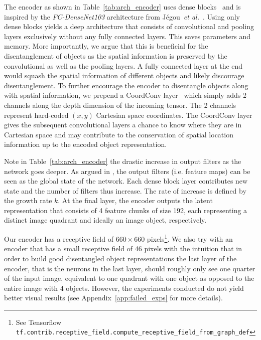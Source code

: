 \documentclass[12pt,a4paper]{article}
\begin{document}
The encoder as shown in Table~\ref{tab:arch_encoder} uses dense blocks~\cite{DenseNet} and is inspired by the \textit{FC-DenseNet103} architecture from Jégou~\textit{et al.}~\cite{Tiramisu}. Using only dense blocks yields a deep architecture that consists of convolutional and pooling layers exclusively without any fully connected layers. This saves parameters and memory. More importantly, we argue that this is beneficial for the disentanglement of objects as the spatial information is preserved by the convolutional as well as the pooling layers. A fully connected layer at the end would squash the spatial information of different objects and likely discourage disentanglement. To further encourage the encoder to disentangle objects along with spatial information, we prepend a CoordConv layer~\cite{CoordConv} which simply adds 2 channels along the depth dimension of the incoming tensor. The 2 channels represent hard-coded $(x,y)$ Cartesian space coordinates. The CoordConv layer gives the subsequent convolutional layers a chance to know where they are in Cartesian space and may contribute to the conservation of spatial location information up to the encoded object representation. 

Note in Table~\ref{tab:arch_encoder} the drastic increase in output filters as the network goes deeper. As argued in \cite{DenseNet}, the output filters (i.e. feature maps) can be seen as the global state of the network. Each dense block layer contributes new state and the number of filters thus increase. The rate of increase is defined by the growth rate $k$. At the final layer, the encoder outputs the latent representation that consists of 4 feature chunks of size 192, each representing a distinct image quadrant and ideally an image object, respectively.

Our encoder has a receptive field of $660 \times 660$ pixels\footnote{See Tensorflow \texttt{tf.contrib.receptive\_field.compute\_receptive\_field\_from\_graph\_def}}. We also try with an encoder that has a small receptive field of 46 pixels with the intuition that in order to build good disentangled object representations the last layer of the encoder, that is the neurons in the last layer, should roughly only see one quarter of the input image, equivalent to one quadrant with one object as opposed to the entire image with 4 objects. However, the experiments conducted do not yield better visual results (see Appendix~\ref{app:failed_exps} for more details).
\end{document}
